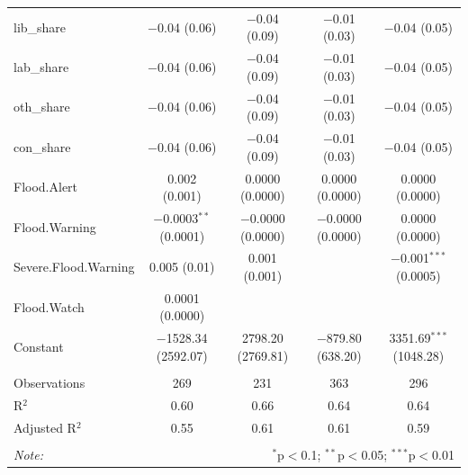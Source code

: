 \documentclass[12pt,letterpaper]{article}
\begin{document}
\begin{table}[!htbp]
\begin{adjustbox}{width=\textwidth}
\begin{tabular}{@{\extracolsep{5pt}}lcccc}
			lib\_share & $-$0.04 (0.06) & $-$0.04 (0.09) & $-$0.01 (0.03) & $-$0.04 (0.05) \\ 
			lab\_share & $-$0.04 (0.06) & $-$0.04 (0.09) & $-$0.01 (0.03) & $-$0.04 (0.05) \\ 
			oth\_share & $-$0.04 (0.06) & $-$0.04 (0.09) & $-$0.01 (0.03) & $-$0.04 (0.05) \\ 
			con\_share & $-$0.04 (0.06) & $-$0.04 (0.09) & $-$0.01 (0.03) & $-$0.04 (0.05) \\ 
			Flood.Alert & 0.002 (0.001) & 0.0000 (0.0000) & 0.0000 (0.0000) & 0.0000 (0.0000) \\ 
			Flood.Warning & $-$0.0003$^{**}$ (0.0001) & $-$0.0000 (0.0000) & $-$0.0000 (0.0000) & 0.0000 (0.0000) \\ 
			Severe.Flood.Warning & 0.005 (0.01) & 0.001 (0.001) &  & $-$0.001$^{***}$ (0.0005) \\ 
			Flood.Watch & 0.0001 (0.0000) &  &  &  \\ 
			Constant & $-$1528.34 (2592.07) & 2798.20 (2769.81) & $-$879.80 (638.20) & 3351.69$^{***}$ (1048.28) \\ 
			\hline \\[-1.8ex] 
			Observations & 269 & 231 & 363 & 296 \\ 
			R$^{2}$ & 0.60 & 0.66 & 0.64 & 0.64 \\ 
			Adjusted R$^{2}$ & 0.55 & 0.61 & 0.61 & 0.59 \\ 
			\hline 
			\hline \\[-1.8ex] 
			\textit{Note:}  & \multicolumn{4}{r}{$^{*}$p$<$0.1; $^{**}$p$<$0.05; $^{***}$p$<$0.01} \\  
		\end{tabular} 
	\end{adjustbox}
\end{table}


\end{document}
